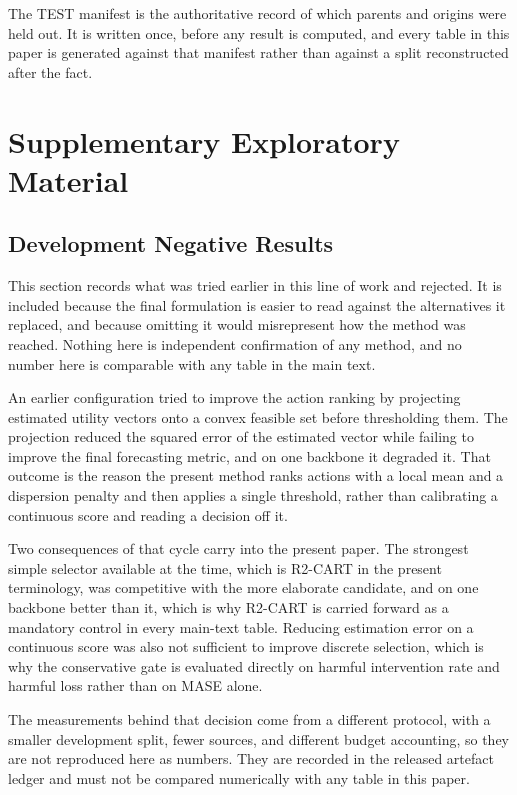 \documentclass{article}
\begin{document}
The TEST manifest is the authoritative record of which parents and origins were held out. It
is written once, before any result is computed, and every table in this paper is generated
against that manifest rather than against a split reconstructed after the fact.

\section*{Supplementary Exploratory Material}
\label{app:supplementary}
\subsection{Development Negative Results}
\label{app:development}
This section records what was tried earlier in this line of work and rejected. It is included
because the final formulation is easier to read against the alternatives it replaced, and
because omitting it would misrepresent how the method was reached. Nothing here is independent
confirmation of any method, and no number here is comparable with any table in the main text.

An earlier configuration tried to improve the action ranking by projecting estimated utility
vectors onto a convex feasible set before thresholding them. The projection reduced the squared
error of the estimated vector while failing to improve the final forecasting metric, and on one
backbone it degraded it. That outcome is the reason the present method ranks actions with a
local mean and a dispersion penalty and then applies a single threshold, rather than
calibrating a continuous score and reading a decision off it.

Two consequences of that cycle carry into the present paper. The strongest simple selector
available at the time, which is R2-CART in the present terminology, was competitive with the
more elaborate candidate, and on one backbone better than it, which is why R2-CART is carried
forward as a mandatory control in every main-text table. Reducing estimation error on a
continuous score was also not sufficient to improve discrete selection, which is why the
conservative gate is evaluated directly on harmful intervention rate and harmful loss rather
than on MASE alone.

The measurements behind that decision come from a different protocol, with a smaller
development split, fewer sources, and different budget accounting, so they are not reproduced
here as numbers. They are recorded in the released artefact ledger and must not be compared
numerically with any table in this paper.
\end{document}
